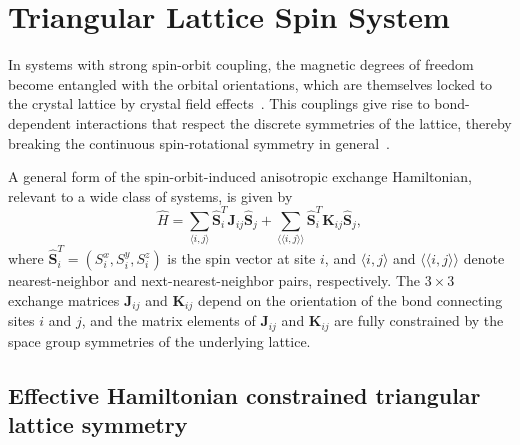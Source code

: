 \documentclass[aps, prx, nofootinbib, preprintnumbers, superscriptaddress]{revtex4-2}
\begin{document}
\section{Triangular Lattice Spin System}


In systems with strong spin-orbit coupling, the magnetic degrees of freedom become entangled with the orbital orientations, which are themselves locked to the crystal lattice by crystal field effects~\cite{witczak2014correlated}. 
This couplings give rise to bond-dependent interactions that respect the discrete symmetries of the lattice, thereby breaking the continuous spin-rotational symmetry in general~\cite{PhysRevB.94.035107}. 

A general form of the spin-orbit-induced anisotropic exchange Hamiltonian, relevant to a wide class of systems, is given by
\begin{equation}\label{eq: general spin exchange Hamiltonian}
    \hat{H} 
    =   %
    \sum_{\langle i,j \rangle} \hat{\mathbf{S}}_{i}^{T} \mathbf{J}_{ij} \hat{\mathbf{S}}_{j} 
    + \sum_{\langle\langle i, j \rangle \rangle} \hat{\mathbf{S}}_{i}^{T} \mathbf{K}_{ij} \hat{\mathbf{S}}_{j}, 
\end{equation}
where $\hat{\mathbf{S}}_i^T = (S_i^x, S_i^y, S_i^z)$ is the spin vector at site $i$, and $\langle i,j \rangle$ and $\langle\langle i, j \rangle \rangle$ denote nearest-neighbor and next-nearest-neighbor pairs, respectively. The $3 \times 3$ exchange matrices $\mathbf{J}_{ij}$ and $\mathbf{K}_{ij}$ depend on the orientation of the bond connecting sites $i$ and $j$, and the matrix elements of $\mathbf{J}_{ij}$ and $\mathbf{K}_{ij}$ are fully constrained by the space group symmetries of the underlying lattice.


\subsection{Effective Hamiltonian constrained triangular lattice symmetry}
\end{document}
